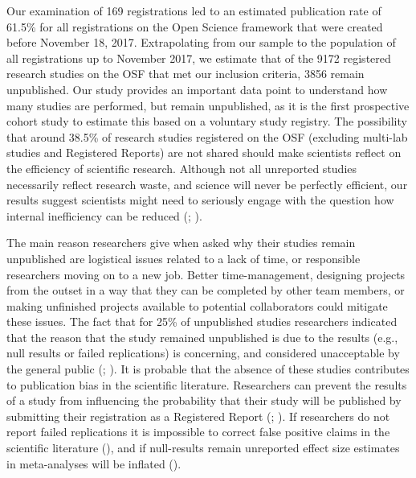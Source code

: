 \documentclass[
  ,man, a4paper,floatsintext]{apa6}
\begin{document}
Our examination of 169 registrations led to an estimated publication rate of 61.5\% for all registrations on the Open Science framework that were created before November 18, 2017. Extrapolating from our sample to the population of all registrations up to November 2017, we estimate that of the 9172 registered research studies on the OSF that met our inclusion criteria, 3856 remain unpublished. Our study provides an important data point to understand how many studies are performed, but remain unpublished, as it is the first prospective cohort study to estimate this based on a voluntary study registry. The possibility that around 38.5\% of research studies registered on the OSF (excluding multi-lab studies and Registered Reports) are not shared should make scientists reflect on the efficiency of scientific research. Although not all unreported studies necessarily reflect research waste, and science will never be perfectly efficient, our results suggest scientists might need to seriously engage with the question how internal inefficiency can be reduced (; ).

The main reason researchers give when asked why their studies remain unpublished are logistical issues related to a lack of time, or responsible researchers moving on to a new job. Better time-management, designing projects from the outset in a way that they can be completed by other team members, or making unfinished projects available to potential collaborators could mitigate these issues. The fact that for 25\% of unpublished studies researchers indicated that the reason that the study remained unpublished is due to the results (e.g., null results or failed replications) is concerning, and considered unacceptable by the general public (; ). It is probable that the absence of these studies contributes to publication bias in the scientific literature. Researchers can prevent the results of a study from influencing the probability that their study will be published by submitting their registration as a Registered Report (; ). If researchers do not report failed replications it is impossible to correct false positive claims in the scientific literature (), and if null-results remain unreported effect size estimates in meta-analyses will be inflated ().
\end{document}

